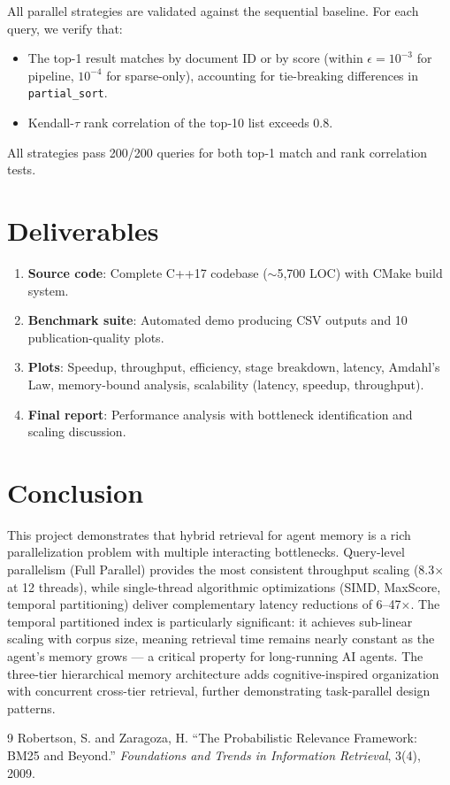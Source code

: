 \documentclass[11pt]{article}
\begin{document}
All parallel strategies are validated against the sequential baseline. For each query, we verify that:
\begin{itemize}[nosep]
    \item The top-1 result matches by document ID or by score (within $\epsilon = 10^{-3}$ for pipeline, $10^{-4}$ for sparse-only), accounting for tie-breaking differences in \texttt{partial\_sort}.
    \item Kendall-$\tau$ rank correlation of the top-10 list exceeds 0.8.
\end{itemize}
All strategies pass 200/200 queries for both top-1 match and rank correlation tests.

\section{Deliverables}

\begin{enumerate}[nosep]
    \item \textbf{Source code}: Complete C++17 codebase ($\sim$5,700 LOC) with CMake build system.
    \item \textbf{Benchmark suite}: Automated demo producing CSV outputs and 10 publication-quality plots.
    \item \textbf{Plots}: Speedup, throughput, efficiency, stage breakdown, latency, Amdahl's Law, memory-bound analysis, scalability (latency, speedup, throughput).
    \item \textbf{Final report}: Performance analysis with bottleneck identification and scaling discussion.
\end{enumerate}

\section{Conclusion}

This project demonstrates that hybrid retrieval for agent memory is a rich parallelization problem with multiple interacting bottlenecks. Query-level parallelism (Full Parallel) provides the most consistent throughput scaling (8.3$\times$ at 12 threads), while single-thread algorithmic optimizations (SIMD, MaxScore, temporal partitioning) deliver complementary latency reductions of 6--47$\times$. The temporal partitioned index is particularly significant: it achieves sub-linear scaling with corpus size, meaning retrieval time remains nearly constant as the agent's memory grows --- a critical property for long-running AI agents. The three-tier hierarchical memory architecture adds cognitive-inspired organization with concurrent cross-tier retrieval, further demonstrating task-parallel design patterns.

\begin{thebibliography}{9}
 Robertson, S. and Zaragoza, H. ``The Probabilistic Relevance Framework: BM25 and Beyond.'' \textit{Foundations and Trends in Information Retrieval}, 3(4), 2009.
\end{thebibliography}
\end{document}
